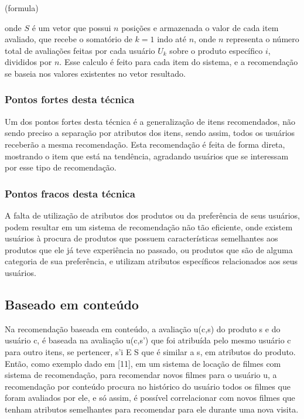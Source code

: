 \documentclass[12pt,
				openright,
				twoside,
				a4paper,
				apter=TITLE,
				section=TITLE,
				subsection=TITLE,
				chapter=TITLE,
				english,
				brazil]{abntex2}
\begin{document}
(formula)

onde $S$ é um vetor que possui $n$ posições e armazenada o valor de cada item avaliado, que recebe o somatório de $k = 1$ indo até $n$, onde $n$ representa o número total de avaliações feitas por cada usuário $U_{k}$ sobre o produto específico $i$, divididos por $n$. Esse calculo é feito para cada item do sistema, e a recomendação se baseia nos valores existentes no vetor resultado.

\subsubsection{Pontos fortes desta técnica}
Um dos pontos fortes desta técnica é a generalização de itens recomendados, não sendo preciso a separação por atributos dos itens, sendo assim, todos os usuários receberão a mesma recomendação. Esta recomendação é feita de forma direta, mostrando o item que está na tendência, agradando usuários que se interessam por esse tipo de recomendação.

\subsubsection{Pontos fracos desta técnica}
A falta de utilização de atributos dos produtos ou da preferência de seus usuários, podem resultar em um sistema de recomendação não tão eficiente, onde existem usuários à procura de produtos que possuem características semelhantes aos produtos que ele já teve experiência no passado, ou produtos que são de alguma categoria de sua preferência, e utilizam atributos específicos relacionados aos seus usuários.


\subsection{Baseado em conteúdo}
Na recomendação baseada em conteúdo, a avaliação u(c,s) do produto s e do usuário c, é baseada na avaliação u(c,s') que foi atribuída pelo mesmo usuário c para outro itens, se pertencer, s'i E S que é similar a s, em atributos do produto. Então, como exemplo dado em [11], em um sistema de locação de filmes com sistema de recomendação, para recomendar novos filmes para o usuário u, a recomendação por conteúdo procura no histórico do usuário todos os filmes que foram avaliados por ele, e só assim, é possível correlacionar com novos filmes que tenham atributos semelhantes para recomendar para ele durante uma nova visita.
\end{document}
